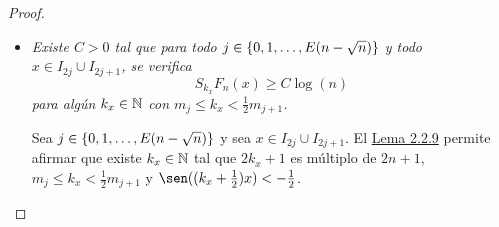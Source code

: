 \documentclass[a4paper, 12pt, oneside]{book}
\begin{document}
\begin{proof}
\begin{itemize}
\begin{align*}
            S_{k}f_n(x) &\geq \frac{1}{2n}\sum_{i=j+1}^n \Bigl(\frac{m_i-k}{m_i+1}+2\sum_{m=1}^{k}\frac{m_i-k}{m_i+1}\cos(m(x-x_{2i}))\Bigr) \\
            &= \frac{1}{2n}\sum_{i=j+1}^n \frac{m_i-k}{m_i+1}\Bigl(1+2\sum_{m=1}^{k} \cos(m(x-x_{2i}))\Bigr) \\
            &= \frac{1}{2n}\sum_{i=j+1}^n \frac{m_i-k}{m_i+1}D_{k}(x-x_{2i}).
        \end{align*}
        Esto completa la prueba de \hyperref[2.2.15]{\color{blue}(2.2.15)}.
        \item \textit{Existe $C > 0$ tal que para todo $j \in \{0,1,\mathellipsis,E(n-\sqrt{n})\}$ y todo $x \in I_{2j}\cup I_{2j+1}$, se verifica
        \begin{equation}\label{2.2.16}
            S_{k_x}F_n(x) \geq C\log(n)
        \end{equation}
        para algún $k_x \in \mathbb N$ con $m_j \leq k_x < \frac{1}{2}m_{j+1}$.
        }

        Sea $j \in \{0,1,\mathellipsis,E(n-\sqrt{n})\}$ y sea $x \in I_{2j} \cup I_{2j+1}$. El \hyperref[2.2.9]{\color{blue}Lema 2.2.9} permite afirmar que existe $k_x \in \mathbb N$ tal que $2k_x+1$ es múltiplo de $2n+1$, $m_{j} \leq k_x < \frac{1}{2}m_{j+1}$ y $\sen((k_x+\frac{1}{2})x) < -\frac{1}{2}$.


\end{itemize}
\end{proof}
\end{document}
